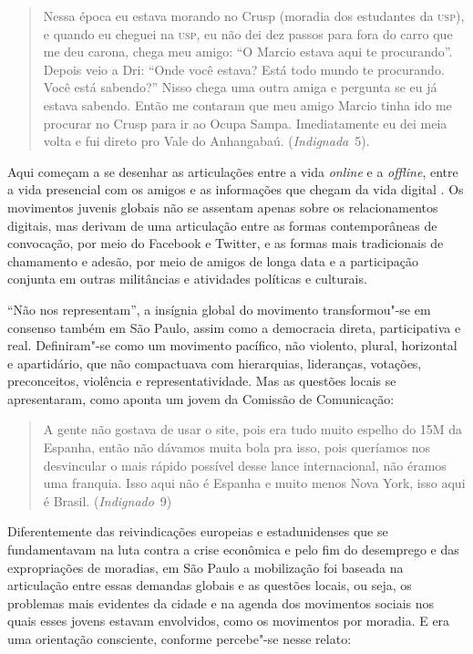\begin{quote}
Nessa época eu estava morando no Crusp (moradia dos estudantes da \textsc{usp}),
e quando eu cheguei na \textsc{usp}, eu não dei dez passos para fora do carro que
me deu carona, chega meu amigo: ``O Marcio estava aqui te procurando''.
Depois veio a Dri: ``Onde você estava? Está todo mundo te procurando.
Você está sabendo?'' Nisso chega uma outra amiga e pergunta se eu já
estava sabendo. Então me contaram que meu amigo Marcio tinha ido me
procurar no Crusp para ir ao Ocupa Sampa. Imediatamente eu dei meia
volta e fui direto pro Vale do Anhangabaú. (\textit{Indignada}~5).
\end{quote}

Aqui começam a se desenhar as articulações entre a vida \textit{online} e
a \textit{offline}, entre a vida presencial com os amigos e as
informações que chegam da vida digital . Os movimentos juvenis globais
não se assentam apenas sobre os relacionamentos digitais, mas derivam de
uma articulação entre as formas contemporâneas de convocação, por meio
do Facebook e Twitter, e as formas mais tradicionais de chamamento e
adesão, por meio de amigos de longa data e a participação conjunta em
outras militâncias e atividades políticas e culturais.

``Não nos representam'', a insígnia global do movimento transformou"-se
em consenso também em São Paulo, assim como a democracia direta,
participativa e real. Definiram"-se como um movimento pacífico, não
violento, plural, horizontal e apartidário, que não compactuava com
hierarquias, lideranças, votações, preconceitos, violência e
representatividade. Mas as questões locais se apresentaram, como aponta
um jovem da Comissão de Comunicação:

\begin{quote}
A gente não gostava de usar o site, pois era tudo muito espelho do 15M
da Espanha, então não dávamos muita bola pra isso, pois queríamos nos
desvincular o mais rápido possível desse lance internacional, não éramos
uma franquia. Isso aqui não é Espanha e muito menos Nova York, isso aqui
é Brasil. (\textit{Indignado}~9)
\end{quote}

Diferentemente das reivindicações europeias e estadunidenses que se
fundamentavam na luta contra a crise econômica e pelo fim do desemprego
e das expropriações de moradias, em São Paulo a mobilização foi baseada
na articulação entre essas demandas globais e as questões locais, ou
seja, os problemas mais evidentes da cidade e na agenda dos movimentos
sociais nos quais esses jovens estavam envolvidos, como os movimentos
por moradia. E era uma orientação consciente, conforme percebe"-se nesse
relato:

